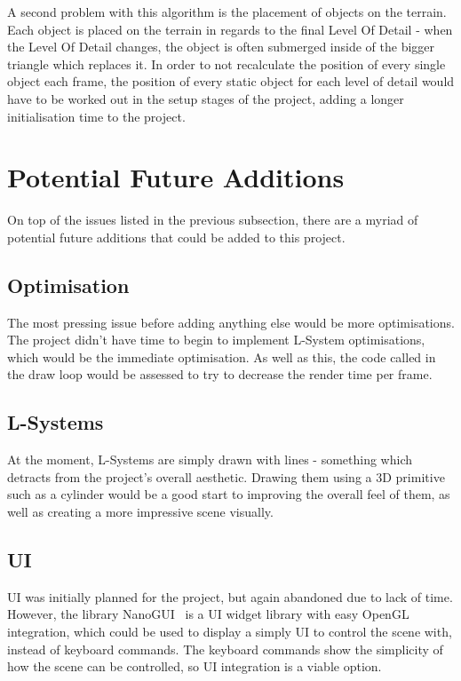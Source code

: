 \documentclass[a4paper,10pt]{report}
\begin{document}
A second problem with this algorithm is the placement of objects on the terrain. Each object is placed on the terrain in regards to the final Level Of Detail - when the Level Of Detail changes, the object is often submerged inside of the bigger triangle which replaces it. In order to not recalculate the position of every single object each frame, the position of every static object for each level of detail would have to be worked out in the setup stages of the project, adding a longer initialisation time to the project. 

\section{Potential Future Additions}

On top of the issues listed in the previous subsection, there are a myriad of potential future additions that could be added to this project. 

\subsection{Optimisation}
The most pressing issue before adding anything else would be more optimisations. The project didn't have time to begin to implement L-System optimisations, which would be the immediate optimisation. As well as this, the code called in the draw loop would be assessed to try to decrease the render time per frame.  

\subsection{L-Systems}
At the moment, L-Systems are simply drawn with lines - something which detracts from the project's overall aesthetic. Drawing them using a 3D primitive such as a cylinder would be a good start to improving the overall feel of them, as well as creating a more impressive scene visually. 

\subsection{UI}

UI was initially planned for the project, but again abandoned due to lack of time. However, the library NanoGUI~\cite{nanogui} is a UI widget library with easy OpenGL integration, which could be used to display a simply UI to control the scene with, instead of keyboard commands. The keyboard commands show the simplicity of how the scene can be controlled, so UI integration is  a viable option.
\end{document}
